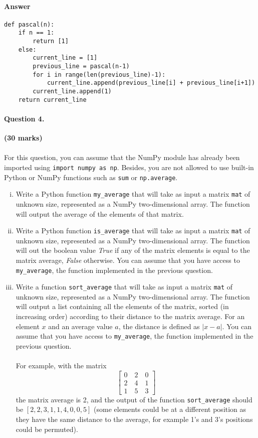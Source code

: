 \documentclass[12pt]{article}
\begin{document}
\paragraph{Answer}
\begin{verbatim}
def pascal(n):
    if n == 1:
        return [1]
    else:
        current_line = [1]
        previous_line = pascal(n-1)
        for i in range(len(previous_line)-1):
            current_line.append(previous_line[i] + previous_line[i+1])
        current_line.append(1)
    return current_line
\end{verbatim}
\clearpage
\paragraph{Question 4. }\hfill {\bf (30 marks)}\\\\
For this question, you can assume that the NumPy module has already been imported using \verb|import numpy as np|. Besides, you are not allowed to use built-in Python or NumPy functions such as \verb|sum| or \verb|np.average|.
\begin{enumerate}[(i)]
\item Write a Python function \verb|my_average| that will take as input a matrix \verb|mat| of unknown size, represented as a NumPy two-dimensional array. The function will output the average of the elements of that matrix.
\item Write a Python function \verb|is_average| that will take as input a matrix \verb|mat| of unknown size, represented as a NumPy two-dimensional array. The function will out the boolean value \textit{True} if any of the matrix elements is equal to the matrix average, \textit{False} otherwise. You can assume that you have access to \verb|my_average|, the function implemented in the previous question.
\item Write a function \verb|sort_average| that will take as input a matrix \verb|mat| of unknown size, represented as a NumPy two-dimensional array. The function will output a list containing all the elements of the matrix, sorted (in increasing order) according to their distance to the matrix average. For an element $x$ and an average value $a$, the distance is defined as $|x-a|$. You can assume that you have access to \verb|my_average|, the function implemented in the previous question.\\\\For example, with the matrix
\[\begin{bmatrix}
 0\quad 2\quad 0\\2\quad 4\quad 1\\1\quad 5\quad 3\end{bmatrix}\]
 the matrix average is 2, and the output of the function \verb|sort_average| should be $[2,2,3,1,1,4,0,0,5]$ (some elements could be at a different position as they have the same distance to the average, for example 1's and 3's positions could be permuted).
\end{enumerate}
\end{document}
